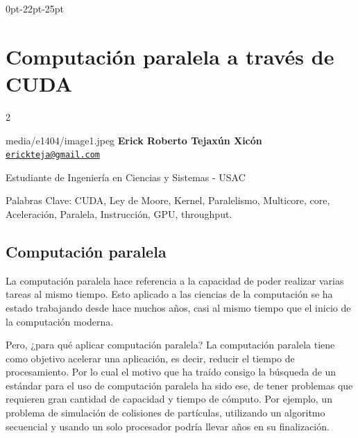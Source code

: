 \documentclass[12pt,spanish,Letterpaper,openany]{book}
\newcommand{\formatsection}{\fontspec{Open Sans Condensed}[SizeFeatures={Size=16},Color=black,LetterSpace=-1.5]}
\newcommand{\labelsection}{\empty}
\newcommand{\sepsection}{0.0em}
\newcommand{\beforecodesection}{\bfseries\selectfont}
\newcommand{\leftchapter}{0pt}
\newcommand{\beforesepchapter}{-22pt}
\newcommand{\afterchapter}{-25pt}
\let\BeginKnitrBlock\begin \let\EndKnitrBlock\end
\begin{document}
\titlespacing*{\chapter} {\leftchapter}{\beforesepchapter}{\afterchapter}

\titleformat{\section}[block]{\formatsection}{\labelsection}{\sepsection}{\beforecodesection#1}

\hypertarget{article04}{%
\chapter{Computación paralela a través de CUDA}\label{article04}}

\begin {multicols}{2}

\BeginKnitrBlock{photobiography3}{media/e1404/image1.jpeg}
\textbf{Erick Roberto Tejaxún Xicón}\\
\href{mailto:erickteja@gmail.com}{\nolinkurl{erickteja@gmail.com}}

\medskip

Estudiante de Ingeniería en Ciencias y Sistemas - USAC\\

\medskip

Palabras Clave: CUDA, Ley de Moore, Kernel, Paralelismo, Multicore, core, Aceleración, Paralela, Instrucción, GPU, throughput.
\EndKnitrBlock{photobiography3}

\hypertarget{computaciuxf3n-paralela}{%
\section{Computación paralela}\label{computaciuxf3n-paralela}}

La computación paralela hace referencia a la capacidad de poder realizar varias tareas al mismo tiempo. Esto aplicado a las ciencias de la computación se ha estado trabajando desde hace muchos años, casi al mismo tiempo que el inicio de la computación moderna.

Pero, ¿para qué aplicar computación paralela? La computación paralela tiene como objetivo acelerar una aplicación, es decir, reducir el tiempo de procesamiento. Por lo cual el motivo que ha traído consigo la búsqueda de un estándar para el uso de computación paralela ha sido ese, de tener problemas que requieren gran cantidad de capacidad y tiempo de cómputo. Por ejemplo, un problema de simulación de colisiones de partículas, utilizando un algoritmo secuencial y usando un solo procesador podría llevar años en su finalización.


\end{multicols}
\end{document}
